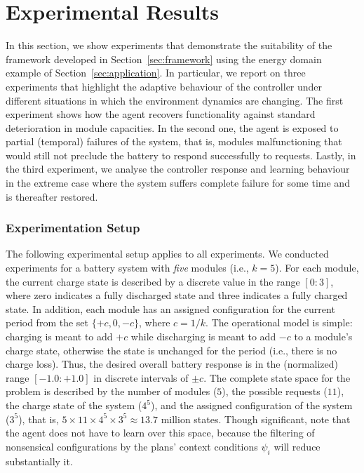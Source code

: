 
\section{Experimental Results}\label{sec:results}

In this section, we show experiments that demonstrate the suitability of the framework developed in Section~\ref{sec:framework} using the energy domain example of Section~\ref{sec:application}. In particular, we report on three experiments that highlight the adaptive behaviour of the controller under different situations in which the environment dynamics are changing. 
The first experiment shows how the agent recovers functionality against standard deterioration in module capacities. In the second one, the agent is exposed to partial (temporal) failures of the system, that is, modules malfunctioning that would still not preclude the battery to respond successfully to requests. Lastly, in the third experiment, we analyse the controller response and learning behaviour in the extreme case where the system suffers complete failure for some time and is thereafter restored.



\subsubsection{Experimentation Setup}

The following experimental setup applies to all experiments. 
We conducted experiments for a battery system with \emph{five} modules (i.e., $k=5$). For each module, the current charge state is described by a discrete value in the range $[0:3]$, where zero indicates a fully discharged state and three indicates a fully charged state. In addition, each module has an assigned configuration for the current period from the set $\{+c, 0, -c\}$, where $c=1/k$. The operational model is simple: charging is meant to add $+c$ while discharging is meant to add $-c$ to a module's charge state, otherwise the state is unchanged for the period (i.e., there is no charge loss).
Thus, the desired overall battery response is in the (normalized) range $[-1.0:+1.0]$ in discrete intervals of $\pm c$. 
The complete state space for the problem is described by the number of modules ($5$), the possible requests ($11$), the charge state of the system ($4^5$), and the assigned configuration of the system ($3^5$), that is, $5 \times 11 \times 4^5 \times 3^5 \approx 13.7$ million states. Though significant, note that the agent does not have to learn over this space, because the filtering of nonsensical configurations by the plans' context conditions $\psi_i$ will reduce substantially it.




